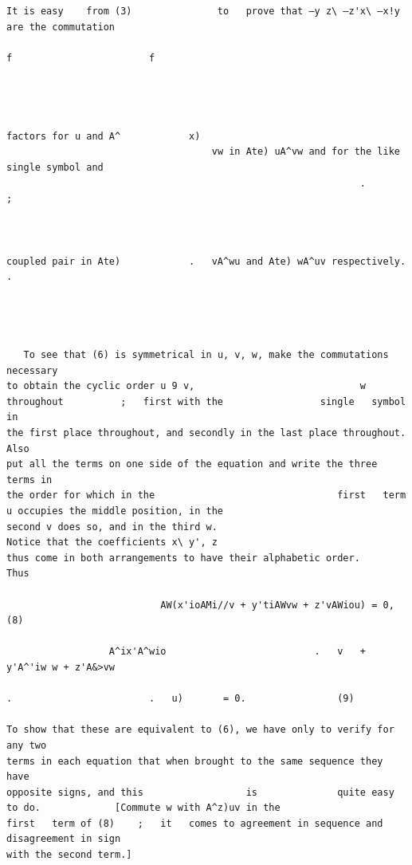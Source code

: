 \documentclass[10pt]{article}
\begin{document}
\begin{verbatim}
It is easy    from (3)               to   prove that —y z\ —z'x\ —x!y are the commutation
                                                                            f                        f




factors for u and A^            x)
                                    vw in Ate) uA^vw and for the like single symbol and
                                                              .             ;



coupled pair in Ate)            .   vA^wu and Ate) wA^uv respectively.  .




   To see that (6) is symmetrical in u, v, w, make the commutations necessary
to obtain the cyclic order u 9 v,                             w throughout          ;   first with the                 single   symbol in
the first place throughout, and secondly in the last place throughout.                                                                   Also
put all the terms on one side of the equation and write the three terms in
the order for which in the                                first   term u occupies the middle position, in the
second v does so, and in the third w.                                           Notice that the coefficients x\ y', z
thus come in both arrangements to have their alphabetic order.                                                                Thus

                           AW(x'ioAMi//v + y'tiAWvw + z'vAWiou) = 0,                                                                      (8)

                  A^ix'A^wio                          .   v   + y'A^'iw w + z'A&>vw
                                                                                .                        .   u)       = 0.                (9)

To show that these are equivalent to (6), we have only to verify for any two
terms in each equation that when brought to the same sequence they have
opposite signs, and this                  is              quite easy to do.             [Commute w with A^z)uv in the
first   term of (8)    ;   it   comes to agreement in sequence and disagreement in sign
with the second term.]


\end{verbatim}
\clearpage
\end{document}
